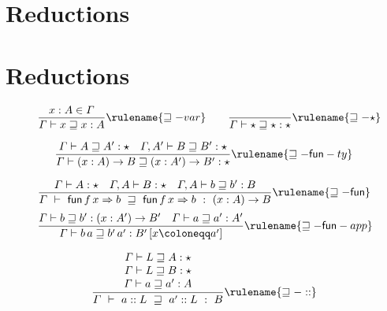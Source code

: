 \section{Reductions}
 



\section{Reductions}




\begin{figure}

  \begin{align*}
   \frac{x:A\in\varGamma}{\varGamma\vdash x\sqsupseteq x:A}\rulename{\sqsupseteq-var}
    \quad & \quad 
    \frac{\ }{\varGamma\vdash\star\sqsupseteq\star:\star}\rulename{\sqsupseteq-\star}
    \\
  \end{align*}
  
  \[
  \frac{
  \varGamma\vdash A\sqsupseteq A':\star \quad
  \varGamma,A'\vdash B\sqsupseteq B':\star
  }{
    \varGamma\vdash\left(x:A\right)\rightarrow B\sqsupseteq\left(x:A'\right)\rightarrow B':\star
  }\rulename{\sqsupseteq-\mathsf{fun}-ty}
  \]
  
  \[
  \frac{
  \varGamma\vdash A:\star\quad\varGamma,A\vdash B:\star \quad
  \varGamma,A\vdash b\sqsupseteq b':B
  }{
    \varGamma\ \vdash\ \mathsf{fun}\,f\,x\Rightarrow b\ \sqsupseteq\ \mathsf{fun}\,f\,x\Rightarrow b\ :\ \left(x:A\right)\rightarrow B
  }\rulename{\sqsupseteq-\mathsf{fun}}
  \]
  \[
  \frac{
  \varGamma\vdash b\sqsupseteq b':\left(x:A'\right)\rightarrow B' \quad
  \varGamma\vdash a\sqsupseteq a':A'
  }{
    \varGamma\vdash b\,a\sqsupseteq b'\,a':B'\left[x\coloneqq a'\right]
  }\rulename{\sqsupseteq-\mathsf{fun}-app}
  \]
  
  \[
  \frac{\begin{array}{c}
    \varGamma\vdash L\sqsupseteq A:\star\\
    \varGamma\vdash L\sqsupseteq B:\star\\
    \varGamma\vdash a\sqsupseteq a':A
    \end{array}}{\varGamma\ \vdash\ a::L\ \sqsupseteq\ a'::L\ :\ B}\rulename{\sqsupseteq-::}
  \]
  

\end{figure}
